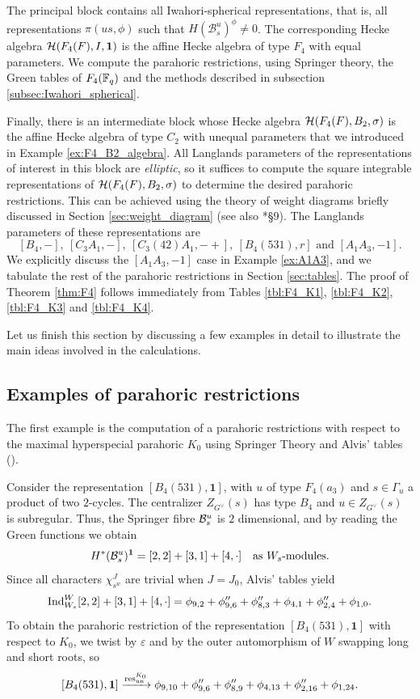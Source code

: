 The principal block contains all Iwahori-spherical representations, that is, all representations $\pi(us,\phi)$ such that $H(\mathcal{B}_s^u)^{\phi}\neq 0$. The corresponding Hecke algebra $\mathcal{H}(F_4(F),I,\mathbf{1})$ is the affine Hecke algebra of type $F_4$ with equal parameters. We compute the parahoric restrictions, using Springer theory, the Green tables of $F_4(\mathbb{F}_q)$ and the methods described in subsection \ref{subsec:Iwahori_spherical}.

Finally, there is an intermediate block whose Hecke algebra $\mathcal{H}(F_4(F),B_2,\sigma)$ is the affine Hecke algebra of type $C_2$ with unequal parameters that we introduced in Example \ref{ex:F4_B2_algebra}. All Langlands parameters of the representations of interest in this block are \textit{elliptic}, so it suffices to compute the square integrable representations of $\mathcal{H}(F_4(F),B_2,\sigma)$ to determine the desired parahoric restrictions. This can be achieved using the theory of weight diagrams briefly discussed in Section \ref{sec:weight_diagram} (see also \cite{Ciubotaru2020}*{\S 9}). The Langlands parameters of these representations are $$[B_4,-],\ [C_3A_1,-],\ [C_3(42)A_1,-+],\ [B_4(531),r] \text{ and } [A_1A_3,-1].$$ 
We explicitly discuss the $[A_1A_3,-1]$ case in Example \ref{ex:A1A3}, and we tabulate the rest of the parahoric restrictions in Section \ref{sec:tables}. The proof of Theorem \ref{thm:F4} follows immediately from Tables \ref{tbl:F4_K1}, \ref{tbl:F4_K2}, \ref{tbl:F4_K3} and \ref{tbl:F4_K4}.

Let us finish this section by discussing a few examples in detail to illustrate the main ideas involved in the calculations. 

\subsection{Examples of parahoric restrictions}
The first example is the computation of a parahoric restrictions with respect to the maximal hyperspecial parahoric $K_0$ using Springer Theory and Alvis' tables (\cite{Alvis2005}).

\begin{example}
    Consider the representation $[B_4(531),\mathbf{1}]$, with $u$ of type $F_4(a_3)$ and $s\in\Gamma_u$ a product of two $2$-cycles. The centralizer $Z_{G^\vee}(s)$ has type $B_4$ and $u\in Z_{G^\vee}(s)$ is subregular. Thus, the Springer fibre $\mathcal{B}^u_s$ is $2$ dimensional, and by reading the Green functions we obtain
    $$H^*(\mathcal{B}^u_s)^\mathbf{1}=[2,2]+[3,1]+[4,\cdot]\quad\text{as $W_s$-modules}.$$
    Since all characters $\chi_{s^w}^{J}$ are trivial when $J=J_0$, Alvis' tables yield
    $$\mathrm{Ind}_{W_s}^W[2,2]+[3,1]+[4,\cdot]=\phi_{9,2}+\phi_{9,6}''+\phi_{8,3}''+\phi_{4,1}+\phi_{2,4}''+\phi_{1,0}.$$
    To obtain the parahoric restriction of the representation $[B_4(531),\mathbf{1}]$ with respect to $K_0$, we twist by $\varepsilon$ and by the outer automorphism of $W$ swapping long and short roots, so
    $$[B_4(531),\mathbf{1}]\xrightarrow{\mathrm{res}^{K_0}_{\mathrm{un}}}\phi_{9,10}+\phi_{9,6}''+\phi_{8,9}''+\phi_{4,13}+\phi_{2,16}''+\phi_{1,24}.$$
\end{example}


